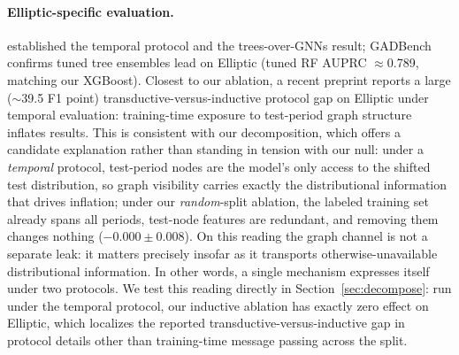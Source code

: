 \documentclass{article}
\begin{document}
\paragraph{Elliptic-specific evaluation.} \citet{weber2019aml} established the
temporal protocol and the trees-over-GNNs result; GADBench \citep{tang2023gadbench}
confirms tuned tree ensembles lead on Elliptic (tuned RF AUPRC $\approx$0.789,
matching our XGBoost). Closest to our ablation, a recent preprint
\citep{maganti2026liability} reports a large ($\sim$39.5 F1 point)
transductive-versus-inductive protocol gap on Elliptic under temporal evaluation:
training-time exposure to test-period graph structure inflates results. This is
consistent with our decomposition, which offers a candidate explanation rather
than standing in tension with our null: under a \emph{temporal} protocol,
test-period nodes are the model's only access to the shifted test distribution,
so graph visibility carries exactly the distributional information that drives
inflation; under our \emph{random}-split ablation, the labeled training set
already spans all periods, test-node features are redundant, and removing them
changes nothing ($-0.000\pm0.008$). On this reading the graph channel is not a
separate leak: it matters precisely insofar as it transports
otherwise-unavailable distributional information. In other words, a single
mechanism expresses itself under two protocols. We test this reading directly in
Section~\ref{sec:decompose}: run under the temporal protocol, our inductive
ablation has exactly zero effect on Elliptic, which localizes the reported
transductive-versus-inductive gap in protocol details other than training-time
message passing across the split.
\end{document}
